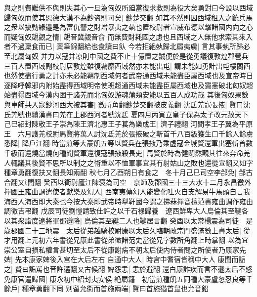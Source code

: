 與之則費難供不與則失其心一旦為匈奴所廹當復求救則為役大矣勇對曰今設以西域歸匈奴而使其恩德大漢不為鈔盗則可矣|{
	鈔楚交翻}
如其不然則因西域租入之饒兵馬之衆以擾動緣邉是為富仇讐之財增暴夷之埶也置校尉者宣威布德以擊諸國内向之心而疑匈奴覬覦之情|{
	覬音冀覦音俞}
而無費財耗國之慮也且西域之人無他求索其來入者不過稟食而已|{
	稟筆錦翻給也食讀曰飤}
今若拒絶埶歸北屬夷虜|{
	言其事埶所歸必至北屬匈奴}
并力以寇并凉則中國之費不止十億置之誠便於是從勇議復敦煌郡營兵三百人置西域副校尉居敦煌雖復覊縻西域然亦未能出屯|{
	謂未能如勇計出屯樓蘭西也然使盡行勇之計亦未必能羈制西域何者武帝通西域未能盡臣屬西域也及宣帝時日逐降呼韓邪内附始盡得西域明帝使班超通西域未能盡臣屬西域也及竇憲破北匈奴超始盡得西域今漢内困于諸羌而北匈奴游魂蒲類安能以五百人成功哉}
其後匈奴果數與車師共入寇鈔河西大被其害|{
	數所角翻鈔楚交翻被皮義翻}
沈氐羌寇張掖|{
	賢曰沈氏羌號也續漢書曰羌在上郡西河者號沈氐}
夏四月丙寅立皇子保為太子改元赦天下　己巳紹封陳敬王子崇為陳王濟北惠王子萇為樂成王|{
	濟子禮翻}
河間孝王子翼為平原王　六月護羌校尉馬賢將萬人討沈氐羌於張掖破之斬首千八百級獲生口千餘人餘虜悉降|{
	降戶江翻}
時當煎等大豪飢五等以賢兵在張掖乃乘虚寇金城賢還軍出塞斬首數千級而還燒當燒何種聞賢軍還復寇張掖殺長吏|{
	馬賢於時為健鬬然觀其往來奔命羌人輒議其後賢不思所以制之之術重以不恤軍事宜其冇射姑山之敗也還從宣翻又如字種章勇翻復扶又翻長知兩翻}
秋七月乙酉朔日有食之　冬十月己巳司空李郃免|{
	郃古合翻又閤翻}
癸酉以衛尉廬江陳褒為司空　京師及郡國三十三大水十二月永昌徼外撣國王雍曲調遣使者獻樂及幻人|{
	西南夷傳幻人能變化吐火自支解易牛馬頭自言我海西人海西即大秦也今按大秦即武帝時犁靬國今謂之拂菻撣音檀范書雍曲調作雍由調徼吉弔翻}
戊辰司徒劉愷請致仕許之以千石禄歸養　遼西鮮卑大人烏倫其至鞬各以其衆詣度遼將軍鄧遵降|{
	烏倫其至鞬二人也鞬居言翻}
癸酉以太常楊震為司徒　是歲郡國二十三地震　太后從弟越騎校尉康以太后久臨朝政宗門盛滿數上書太后|{
	從才用翻上元初六年書從兄康此書從弟徵諸范史當從兄字數所角翻上時掌翻}
以為宜崇公室自損私權言甚切至太后不從康謝病不朝太后使内侍者問之所使者乃康家先婢|{
	先本康家婢後入宫在大后左右}
自通中大人|{
	時宫中耆宿皆稱中大人}
康聞而詬之|{
	賢曰詬罵也音許遘翻又古候翻}
婢怨恚|{
	恚於避翻}
還白康詐疾而言不遜太后不怒免康官遣歸國|{
	康永初中紹封夷安侯}
絶屬籍　初當煎種飢五同種大豪盧怱忍良等千餘戶|{
	種章勇翻下同}
别留允街而首施兩端|{
	賢曰首施猶首鼠也允音鉛}


